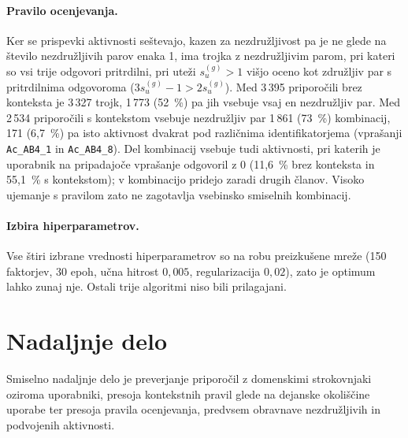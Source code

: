 \documentclass[a4paper,twoside,openright,12pt,slovene]{book}
\begin{document}
\paragraph{Pravilo ocenjevanja.}
Ker se prispevki aktivnosti
seštevajo, kazen za nezdružljivost pa je ne glede na število nezdružljivih parov enaka 1, ima trojka
z nezdružljivim parom, pri kateri so vsi trije odgovori pritrdilni, pri uteži $s_u^{(g)} > 1$
višjo oceno kot združljiv par s pritrdilnima odgovoroma ($3s_u^{(g)} - 1 > 2s_u^{(g)}$). Med 3\,395
priporočili brez konteksta je 3\,327 trojk, 1\,773 (52~\%) pa jih vsebuje vsaj en nezdružljiv par.
Med 2\,534 priporočili s kontekstom vsebuje nezdružljiv par 1\,861 (73~\%) kombinacij, 171 (6,7~\%)
pa isto aktivnost dvakrat pod različnima identifikatorjema (vprašanji \texttt{Ac\_AB4\_1} in
\texttt{Ac\_AB4\_8}). Del kombinacij vsebuje tudi aktivnosti, pri katerih je uporabnik na pripadajoče
vprašanje odgovoril z 0 (11,6~\% brez konteksta in 55,1~\% s kontekstom); v kombinacijo pridejo
zaradi drugih članov. Visoko ujemanje s pravilom zato ne zagotavlja vsebinsko smiselnih kombinacij.

\paragraph{Izbira hiperparametrov.}
Vse štiri izbrane vrednosti hiperparametrov so na robu preizkušene mreže
(150 faktorjev, 30 epoh, učna hitrost $0{,}005$, regularizacija $0{,}02$),
zato je optimum lahko zunaj nje. Ostali trije algoritmi niso bili
prilagajani.

\section{Nadaljnje delo}

Smiselno nadaljnje delo je preverjanje priporočil
z domenskimi strokovnjaki oziroma uporabniki,
presoja kontekstnih pravil glede na dejanske
okoliščine uporabe ter presoja pravila ocenjevanja, predvsem
obravnave nezdružljivih in podvojenih aktivnosti.

\cleardoublepage{} %


\end{document}
